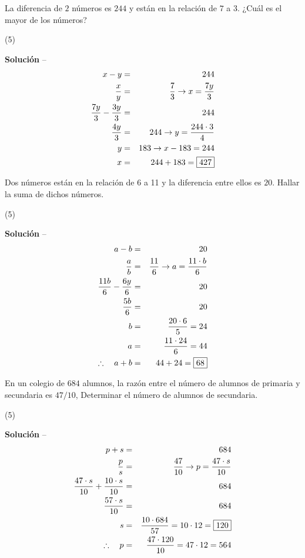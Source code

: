 \item{La diferencia de $2$ números es $244$ y están en la relación de $7$ a $3$. ¿Cuál es el mayor de los números?
\begin{tasks}(5)
\end{tasks}
\noindent \textbf{Solución} -- 
\begin{eqnarray*}
	x - y &=& 244 \\
	\dfrac{x}{y} &=& \dfrac{7}{3} \to x = \dfrac{7y}{3} \\
	\dfrac{7y}{3} - \dfrac{3y}{3} &=& 244 \\
	\dfrac{4y}{3} &=& 244 \to y = \dfrac{244 \cdot 3}{4} \\
	y &=& 183 \to x - 183 = 244 \\
	x &=& 244 + 183 = \fbox{427}
\end{eqnarray*}
}

\item{Dos números están en la relación de 6 a 11 y la diferencia entre ellos es $20$. Hallar la suma de dichos números.
\begin{tasks}(5)
\end{tasks}
\noindent \textbf{Solución} -- 
\begin{eqnarray*}
a - b &=& 20 \\
\dfrac{a}{b} &=& \dfrac{11}{6} \to a = \dfrac{11 \cdot b}{6} \\ %
\dfrac{11 b}{6} - \dfrac{6y}{6} &=& 20  \\
\dfrac{5 b}{6} &=& 20 \\
b &=& \dfrac{20 \cdot 6}{5} = 24 \\
a &=& \dfrac{11 \cdot 24}{6} = 44 \\
\therefore\quad a + b &=& 44 + 24 = \fbox{68} 
\end{eqnarray*}
}

\item{En un colegio de $684$ alumnos, la razón entre el número de alumnos de primaria y secundaria es $47/10$, Determinar el número de alumnos de secundaria. 
\begin{tasks}(5)
\end{tasks}
\noindent \textbf{Solución} -- 
\begin{eqnarray*}
p + s &=& 684 \\
\dfrac{p}{s} &=& \dfrac{47}{10} \to p = \dfrac{47 \cdot s}{10} \\
\dfrac{47 \cdot s}{10} + \dfrac{10 \cdot s}{10} &=& 684 \\
\dfrac{57 \cdot s}{10} &=& 684 \\
s &=& \dfrac{10 \cdot 684}{57} = 10 \cdot 12 = \fbox{120} \\
\therefore\quad p &=& \dfrac{47 \cdot 120}{10} = 47 \cdot 12 = 564 
\end{eqnarray*}
}

